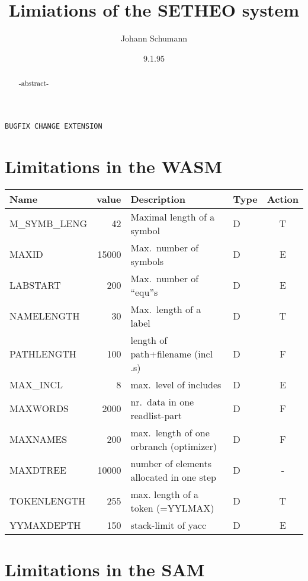 

\title{Limiations of the SETHEO system}
\author{Johann Schumann}
\date{9.1.95}



\maketitle

\begin{abstract}
-abstract-
\end{abstract}


 {\tt BUGFIX  CHANGE EXTENSION}

\section{Limitations in the WASM}

\begin{tabular}{|l|r|l|l|c|}
Name & value & Description & Type & Action \\
\hline
M\_SYMB\_LENG & 42 & Maximal length of a symbol & D & T\\
MAXID & 15000 & Max.~number of symbols & D & E \\
LABSTART & 200 & Max.~number of ``equ''s & D & E\\
NAMELENGTH & 30 & Max.~length of a label & D & T\\
PATHLENGTH & 100 & length of path+filename (incl .s) & D & F\\
MAX\_INCL & 8 & max.~level of includes & D & E\\
MAXWORDS & 2000 & nr.~data in one readlist-part & D & F\\
MAXNAMES & 200 & max.~length of one orbranch (optimizer) & D & F\\
MAXDTREE & 10000 & number of elements allocated in one step & D & -\\
TOKENLENGTH & 255 & max. length of a token (=YYLMAX) & D & T \\
YYMAXDEPTH & 150 & stack-limit of yacc & D & E \\
\hline
\end{tabular}

\section{Limitations in the SAM}

